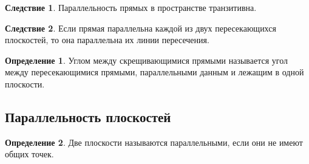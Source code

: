 \documentclass[12pt]{article}
\theoremstyle{definition}
\newtheorem{definition}{Определение}
\newtheorem{consequence}{Следствие}[subsection]
\begin{document}
    \begin{consequence}
        Параллельность прямых в пространстве транзитивна.
    \end{consequence}
    \begin{consequence}
        Если прямая параллельна каждой из двух пересекающихся плоскостей,
    то она параллельна их линии пересечения.
    \end{consequence}
    \begin{definition}
        Углом между скрещивающимися прямыми называется угол между пересекающимися прямыми, параллельными данным и лежащим в одной плоскости.
    \end{definition}
    
    \subsection{Параллельность плоскостей}
    
    \begin{definition}
        Две плоскости называются параллельными, если они не имеют общих точек.
    \end{definition}
    
\end{document}

